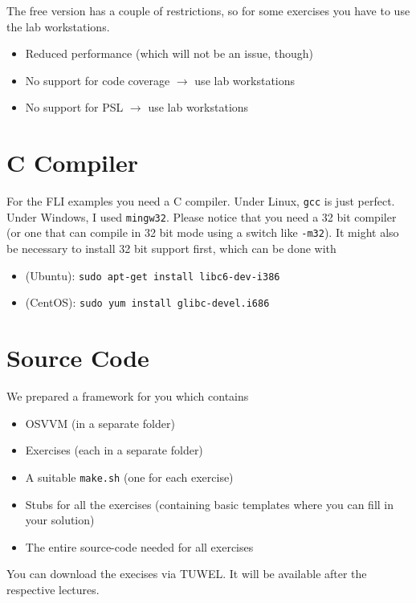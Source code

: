 \documentclass[12pt,epsf,makeidx,oneside]{book}
\begin{document}
  The free version has a couple of restrictions, so for some exercises you have to use the lab workstations.
  \begin{itemize}[noitemsep]
    \item Reduced performance (which will not be an issue, though)
    \item No support for code coverage $\rightarrow$ use lab workstations
    \item No support for PSL $\rightarrow$ use lab workstations
  \end {itemize}

\section{C Compiler}
  For the FLI examples you need a C compiler. Under Linux, {\tt gcc} is just perfect. Under Windows, I used {\tt mingw32}. Please notice that you need a 32 bit compiler (or one that can compile in 32 bit mode using a switch like {\tt -m32}).
  It might also be necessary to install 32 bit support first, which can be done with 
  \begin{itemize}
    \item (Ubuntu): {\tt sudo apt-get install libc6-dev-i386}
    \item (CentOS): {\tt sudo yum install glibc-devel.i686 }
  \end{itemize}

\section{Source Code}
  We prepared a framework for you which contains
  \begin{itemize}[noitemsep]
    \item OSVVM (in a separate folder)
    \item Exercises (each in a separate folder)
    \item A suitable {\tt make.sh} (one for each exercise)
    \item Stubs for all the exercises (containing basic templates where you can fill in your solution)
    \item The entire source-code needed for all exercises
  \end {itemize}

  You can download the execises via TUWEL. It will be available after the respective lectures.

  \vspace*{0.7cm}
\end{document}
